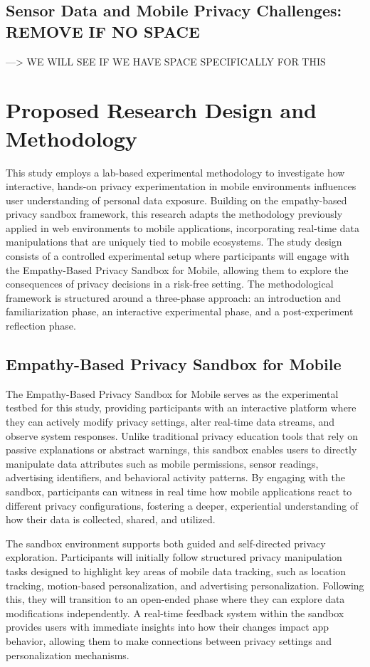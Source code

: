 \documentclass[acmlarge, nonacm]{acmart}
\begin{document}
\subsection{Sensor Data and Mobile Privacy Challenges: REMOVE IF NO SPACE}
 ---> WE WILL SEE IF WE HAVE SPACE SPECIFICALLY FOR THIS

\section{Proposed Research Design and Methodology}
This study employs a lab-based experimental methodology to investigate how interactive, hands-on privacy experimentation in mobile environments influences user understanding of personal data exposure. Building on the empathy-based privacy sandbox framework, this research adapts the methodology previously applied in web environments to mobile applications, incorporating real-time data manipulations that are uniquely tied to mobile ecosystems. The study design consists of a controlled experimental setup where participants will engage with the Empathy-Based Privacy Sandbox for Mobile, allowing them to explore the consequences of privacy decisions in a risk-free setting. The methodological framework is structured around a three-phase approach: an introduction and familiarization phase, an interactive experimental phase, and a post-experiment reflection phase.

\subsection{Empathy-Based Privacy Sandbox for Mobile}

The Empathy-Based Privacy Sandbox for Mobile serves as the experimental testbed for this study, providing participants with an interactive platform where they can actively modify privacy settings, alter real-time data streams, and observe system responses. Unlike traditional privacy education tools that rely on passive explanations or abstract warnings, this sandbox enables users to directly manipulate data attributes such as mobile permissions, sensor readings, advertising identifiers, and behavioral activity patterns. By engaging with the sandbox, participants can witness in real time how mobile applications react to different privacy configurations, fostering a deeper, experiential understanding of how their data is collected, shared, and utilized.

The sandbox environment supports both guided and self-directed privacy exploration. Participants will initially follow structured privacy manipulation tasks designed to highlight key areas of mobile data tracking, such as location tracking, motion-based personalization, and advertising personalization. Following this, they will transition to an open-ended phase where they can explore data modifications independently. A real-time feedback system within the sandbox provides users with immediate insights into how their changes impact app behavior, allowing them to make connections between privacy settings and personalization mechanisms.
\end{document}
